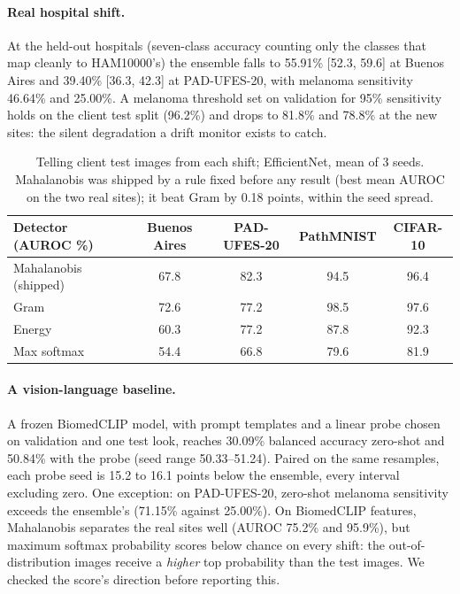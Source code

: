 \documentclass[11pt]{article}
\begin{document}
\paragraph{Real hospital shift.} At the held-out hospitals (seven-class accuracy counting only the classes
that map cleanly to HAM10000's) the ensemble falls to 55.91\%
[52.3, 59.6] at Buenos Aires and 39.40\% [36.3, 42.3] at PAD-UFES-20, with melanoma sensitivity
46.64\% and 25.00\%. A melanoma threshold set on validation for 95\% sensitivity holds on the
client test split (96.2\%) and drops to 81.8\% and 78.8\% at the new sites: the silent
degradation a drift monitor exists to catch.

\begin{table}[ht]
\centering\small
\begin{tabular}{lcccc}
\toprule
Detector (AUROC \%) & Buenos Aires & PAD-UFES-20 & PathMNIST & CIFAR-10\\
\midrule
Mahalanobis (shipped) & 67.8 & 82.3 & 94.5 & 96.4\\
Gram & 72.6 & 77.2 & 98.5 & 97.6\\
Energy & 60.3 & 77.2 & 87.8 & 92.3\\
Max softmax & 54.4 & 66.8 & 79.6 & 81.9\\
\bottomrule
\end{tabular}
\caption{Telling client test images from each shift; EfficientNet, mean of 3 seeds.
Mahalanobis was shipped by a rule fixed before any result (best mean AUROC on the two real
sites); it beat Gram by 0.18 points, within the seed spread.}
\end{table}

\paragraph{A vision-language baseline.} A frozen BiomedCLIP model, with prompt templates and a
linear probe chosen on validation and one test look, reaches 30.09\% balanced accuracy zero-shot
and 50.84\% with the probe (seed range 50.33--51.24). Paired on the same resamples, each probe
seed is 15.2 to 16.1 points below the ensemble, every interval excluding zero. One exception: on
PAD-UFES-20, zero-shot melanoma sensitivity exceeds the ensemble's (71.15\% against 25.00\%).
On BiomedCLIP features, Mahalanobis separates the real sites well (AUROC 75.2\% and 95.9\%), but
maximum softmax probability scores below chance on every shift: the out-of-distribution images
receive a \emph{higher} top probability than the test images. We checked the score's direction
before reporting this.
\end{document}
